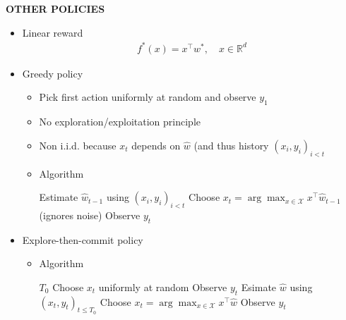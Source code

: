 \begin{whitebox}{\textbf{OTHER POLICIES}}
    \begin{itemize}
        \item Linear reward
        \begin{align*}
            f^*(x)=x^\top w^*,\quad x\in\mathbb{R}^d
        \end{align*}
        \item Greedy policy
        \begin{itemize}
            \item Pick first action uniformly at random and observe $y_1$
            \item No exploration/exploitation principle
            \item Non i.i.d. because $x_t$ depends on $\hat{w}$ (and thus history $(x_i,y_i)_{i<t}$
            \item Algorithm
            \begin{algorithmic}
                \footnotesize
                \State Estimate $\hat{w}_{t-1}$ using $(x_i,y_i)_{i<t}$
                \State Choose $x_t=\arg\max_{x\in\mathcal{X}}x^\top\hat{w}_{t-1}$ (ignores noise)
                \State Observe $y_t$
                \EndFor
            \end{algorithmic}
        \end{itemize}
        \item Explore-then-commit policy
        \begin{itemize}
            \item Algorithm
            \begin{algorithmic}
                \footnotesize
                \Require $T_0$
                \State Choose $x_t$ uniformly at random
                \State Observe $y_t$
                \EndFor
                \State Esimate $\hat{w}$ using $(x_t,y_t)_{t\leq T_0}$
                \State Choose $x_t=\arg\max_{x\in\mathcal{X}}x^\top\hat{w}$
                \State Observe $y_t$                
                \EndFor
            \end{algorithmic}
        \end{itemize}
    \end{itemize}
\end{whitebox}


